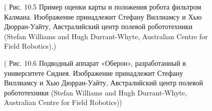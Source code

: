 \documentclass[10pt,a4paper]{article}
\begin{document}
\begin{figure}[H]
	\caption{ ( Рис. 10.5 Пример оценки карты и положения робота фильтром Калмана. Изображение принадлежит Стефану Виллиамсу и Хью Дюрран-Уайту, Австралийский центр полевой робототехники (Stefan Williams and Hugh Durrant-Whyte, Australian Centre for Field Robotics).)}
	\label{fig:105orig}
\end{figure}

\begin{figure}[H]
	\caption{ ( Рис. 10.6 Подводный аппарат «Оберон», разработанный в университете Сиднея. Изображение принадлежит Стефану Виллиамсу и Хью Дюрран-Уайту, Австралийский центр полевой робототехники (Stefan Williams and Hugh Durrant-Whyte, Australian Centre for Field Robotics))}
	\label{fig:106orig}
\end{figure}
\end{document}
